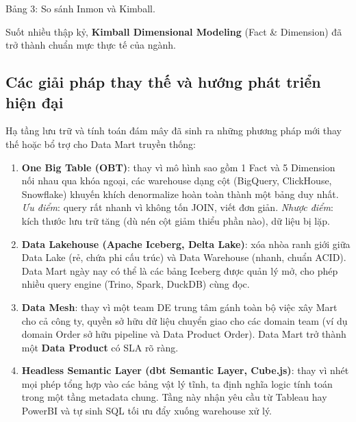 \documentclass[12pt]{article}
\begin{document}
\begin{captionbelowboxaivn}
Bảng 3: So sánh Inmon và Kimball.
\end{captionbelowboxaivn}

Suốt nhiều thập kỷ, \textbf{Kimball Dimensional Modeling} (Fact \& Dimension) đã trở thành chuẩn mực thực tế của ngành.

\subsection{Các giải pháp thay thế và hướng phát triển hiện đại}

Hạ tầng lưu trữ và tính toán đám mây đã sinh ra những phương pháp mới thay thế hoặc bổ trợ cho Data Mart truyền thống:

\begin{enumerate}
    \item \textbf{One Big Table (OBT)}: thay vì mô hình sao gồm 1 Fact và 5 Dimension nối nhau qua khóa ngoại, các warehouse dạng cột (BigQuery, ClickHouse, Snowflake) khuyến khích denormalize hoàn toàn thành một bảng duy nhất. \emph{Ưu điểm}: query rất nhanh vì không tốn JOIN, viết đơn giản. \emph{Nhược điểm}: kích thước lưu trữ tăng (dù nén cột giảm thiểu phần nào), dữ liệu bị lặp.
    \item \textbf{Data Lakehouse (Apache Iceberg, Delta Lake)}: xóa nhòa ranh giới giữa Data Lake (rẻ, chứa phi cấu trúc) và Data Warehouse (nhanh, chuẩn ACID). Data Mart ngày nay có thể là các bảng Iceberg được quản lý mở, cho phép nhiều query engine (Trino, Spark, DuckDB) cùng đọc.
    \item \textbf{Data Mesh}: thay vì một team DE trung tâm gánh toàn bộ việc xây Mart cho cả công ty, quyền sở hữu dữ liệu chuyển giao cho các domain team (ví dụ domain Order sở hữu pipeline và Data Product Order). Data Mart trở thành một \textbf{Data Product} có SLA rõ ràng.
    \item \textbf{Headless Semantic Layer (dbt Semantic Layer, Cube.js)}: thay vì nhét mọi phép tổng hợp vào các bảng vật lý tĩnh, ta định nghĩa logic tính toán trong một tầng metadata chung. Tầng này nhận yêu cầu từ Tableau hay PowerBI và tự sinh SQL tối ưu đẩy xuống warehouse xử lý.
\end{enumerate}
\end{document}
